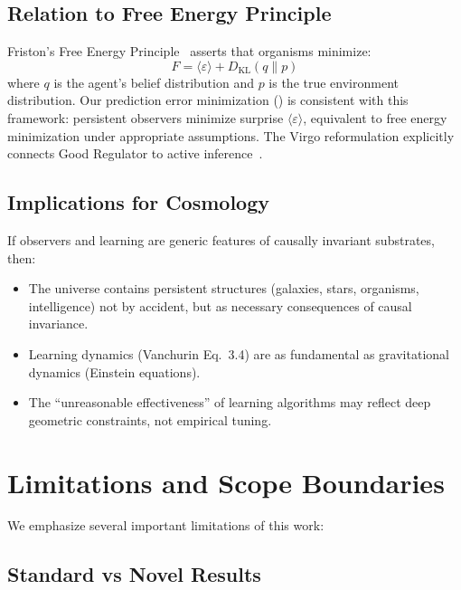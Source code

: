 \documentclass[11pt,a4paper]{article}
\theoremstyle{plain}
\theoremstyle{definition}
\theoremstyle{remark}
\newcommand{\eps}{\varepsilon}
\begin{document}
\subsection{Relation to Free Energy Principle}

Friston's Free Energy Principle~\cite{friston2010free} asserts that organisms minimize:
\begin{equation}
F = \langle \eps \rangle + D_{\text{KL}}(q \| p)
\end{equation}
where $q$ is the agent's belief distribution and $p$ is the true environment distribution. Our prediction error minimization () is consistent with this framework: persistent observers minimize surprise $\langle \eps \rangle$, equivalent to free energy minimization under appropriate assumptions. The Virgo reformulation explicitly connects Good Regulator to active inference~\cite{virgo2025good}.

\subsection{Implications for Cosmology}

If observers and learning are generic features of causally invariant substrates, then:
\begin{itemize}[noitemsep]
\item The universe contains persistent structures (galaxies, stars, organisms, intelligence) not by accident, but as necessary consequences of causal invariance.
\item Learning dynamics (Vanchurin Eq.~3.4) are as fundamental as gravitational dynamics (Einstein equations).
\item The ``unreasonable effectiveness'' of learning algorithms may reflect deep geometric constraints, not empirical tuning.
\end{itemize}


\section{Limitations and Scope Boundaries}
\label{sec:limitations}

We emphasize several important limitations of this work:

\subsection{Standard vs Novel Results}
\end{document}
